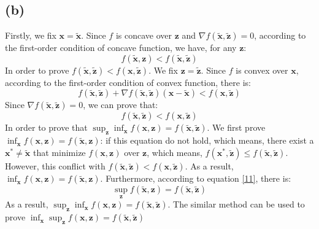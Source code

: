 \documentclass[10pt,a4paper]{article}
\begin{document}
\subsection*{(b)}
Firstly, we fix $\mathbf{x} = \tilde{\mathbf{x}}$. Since $f$ is concave over $\mathbf{z}$ and $\nabla f(\tilde{\mathbf{x}}, \tilde{\mathbf{z}}) = 0$, according to the first-order condition of concave function, we have, for any $\mathbf{z}$:
\begin{equation}
	f(\tilde{\mathbf{x}}, \mathbf{z}) < f(\tilde{\mathbf{x}}, \tilde{\mathbf{z}})
	\label{11}
\end{equation}
In order to prove $f(\tilde{\mathbf{x}}, \tilde{\mathbf{z}}) < f(\mathbf{x}, \tilde{\mathbf{z}})$. We fix $\mathbf{z} = \tilde{\mathbf{z}}$. Since $f$ is convex over $\mathbf{x}$, according to the first-order condition of convex function, there is:
\begin{equation*}
	f(\tilde{\mathbf{x}}, \tilde{\mathbf{z}}) + \nabla f(\tilde{\mathbf{x}}, \tilde{\mathbf{z}}) (\mathbf{x} - \tilde{\mathbf{x}}) < f(\mathbf{x}, \tilde{\mathbf{z}})
\end{equation*}
Since $\nabla f(\tilde{\mathbf{x}}, \tilde{\mathbf{z}}) = 0$, we can prove that:
\begin{equation*}
	f(\tilde{\mathbf{x}}, \tilde{\mathbf{z}}) < f(\mathbf{x}, \tilde{\mathbf{z}})
\end{equation*}
In order to prove that $\displaystyle\sup_{\mathbf{z}} \displaystyle\inf_{\mathbf{x}}f(\mathbf{x}, \mathbf{z}) = f(\tilde{\mathbf{x}}, \tilde{\mathbf{z}})$. We first prove $\displaystyle\inf_{\mathbf{x}}f(\mathbf{x}, \mathbf{z}) = f(\tilde{\mathbf{x}}, \mathbf{z})$: if this equation do not hold, which means, there exist a $\mathbf{x^{*}} \neq \tilde{\mathbf{x}}$ that minimize $f(\mathbf{x}, \mathbf{z})$ over $\mathbf{z}$, which means, $f(\mathbf{x}^{*}, \tilde{\mathbf{z}}) \leq f(\tilde{\mathbf{x}}, \tilde{\mathbf{z}})$. However, this conflict with $f(\tilde{\mathbf{x}}, \tilde{\mathbf{z}}) < f(\mathbf{x}, \tilde{\mathbf{z}})$. As a result, $\displaystyle\inf_{\mathbf{x}}f(\mathbf{x}, \mathbf{z}) = f(\tilde{\mathbf{x}}, \mathbf{z})$. Furthermore, according to equation \ref{11}, there is:
\begin{equation*}
	\displaystyle\sup_{\mathbf{z}} f(\tilde{\mathbf{x}}, \mathbf{z}) = f(\tilde{\mathbf{x}}, \tilde{\mathbf{z}})
\end{equation*}
As a result, $\displaystyle\sup_{\mathbf{z}} \displaystyle\inf_{\mathbf{x}}f(\mathbf{x}, \mathbf{z}) = f(\tilde{\mathbf{x}}, \tilde{\mathbf{z}})$. The similar method can be used  to prove $\displaystyle\inf_{\mathbf{x}}\sup_{\mathbf{z}} f(\mathbf{x}, \mathbf{z}) = f(\tilde{\mathbf{x}}, \tilde{\mathbf{z}})$
\end{document}
